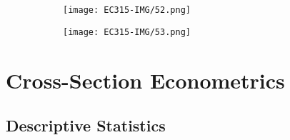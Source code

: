 \documentclass[11pt, english]{article}
\begin{document}
	\begin{figure}[H]      
        \begin{center}                     
                \begin{subfigure}[t]{7cm}  
                \begin{center}             
                        \texttt{[image: EC315-IMG/52.png]}
                \end{center}               
                \end{subfigure}            
                \begin{subfigure}[t]{7cm}  
                \begin{center}                                                    
                        \texttt{[image: EC315-IMG/53.png]}
                \end{center}   
                \end{subfigure}
        \end{center}
        \end{figure}

\newpage

\section{Cross-Section Econometrics}

	\subsection{Descriptive Statistics}
\end{document}
